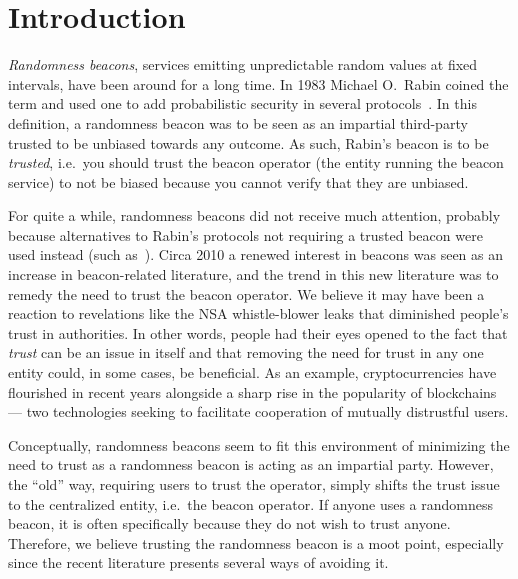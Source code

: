 \section{Introduction}
\emph{Randomness beacons}, services emitting unpredictable random values at fixed intervals, have been around for a long time.
In 1983 Michael O.\ Rabin coined the term and used one to add probabilistic security in several protocols~\cite{rabin1983transaction}.
In this definition, a randomness beacon was to be seen as an impartial third-party trusted to be unbiased towards any outcome.
As such, Rabin's beacon is to be \emph{trusted}, i.e.\ you should trust the beacon operator (the entity running the beacon service) to not be biased because you cannot verify that they are unbiased.

For quite a while, randomness beacons did not receive much attention, probably because alternatives to Rabin's protocols not requiring a trusted beacon were used instead (such as~\cite{BGMR}).
Circa 2010 a renewed interest in beacons was seen as an increase in beacon-related literature, and the trend in this new literature was to remedy the need to trust the beacon operator.
We believe it may have been a reaction to revelations like the NSA whistle-blower leaks that diminished people's trust in authorities.
In other words, people had their eyes opened to the fact that \emph{trust} can be an issue in itself and that removing the need for trust in any one entity could, in some cases, be beneficial.
As an example, cryptocurrencies have flourished in recent years alongside a sharp rise in the popularity of blockchains --- two technologies seeking to facilitate cooperation of mutually distrustful users.

Conceptually, randomness beacons seem to fit this environment of minimizing the need to trust as a randomness beacon is acting as an impartial party.
However, the \enquote{old} way, requiring users to trust the operator, simply shifts the trust issue to the centralized entity, i.e.\ the beacon operator.
If anyone uses a randomness beacon, it is often specifically because they do not wish to trust anyone.
Therefore, we believe trusting the randomness beacon is a moot point, especially since the recent literature presents several ways of avoiding it.

